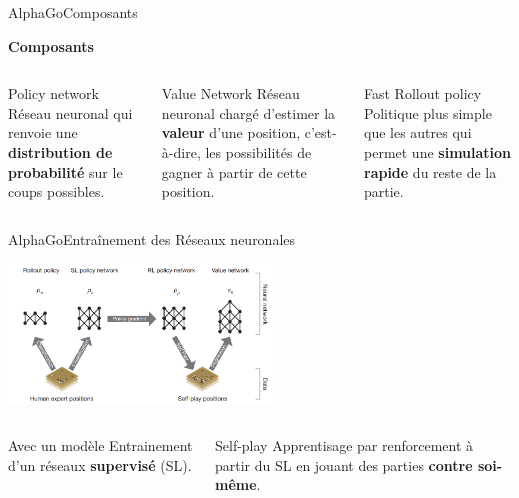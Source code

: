 \begin{frame}{AlphaGo}{Composants}
    \begin{center}
        \textbf{Composants}
    \end{center}
    \begin{columns}[t]
        \begin{column}{.3\textwidth}
            \begin{block}{Policy network}
                Réseau neuronal qui renvoie une \textbf{distribution de probabilité} sur le coups possibles.
            \end{block}
        \end{column}
        \begin{column}{.3\textwidth}
            \begin{block}{Value Network}
                Réseau neuronal chargé d'estimer la \textbf{valeur} d'une position, c'est-à-dire, les possibilités de gagner à partir de cette position.
            \end{block}
        \end{column}
        \begin{column}{.3\textwidth}
            \begin{block}{Fast Rollout policy}
                Politique plus simple que les autres qui permet une \textbf{simulation rapide} du reste de la partie.
            \end{block}
        \end{column}
    \end{columns}
\end{frame}

\begin{frame}{AlphaGo}{Entraînement des Réseaux neuronales}
    \begin{center}
        \includegraphics[width=7cm]{ressources/AlphaGo/Entrainement}
        \begin{columns}[t]
            \begin{column}{.4\textwidth}
                \begin{block}{Avec un modèle}
                    Entrainement d'un réseaux \textbf{supervisé} (SL).
                \end{block}
            \end{column}
            \begin{column}{.4\textwidth}
                \begin{block}{Self-play}
                    Apprentisage par renforcement à partir du SL en jouant des parties \textbf{contre soi-même}.
                \end{block}
            \end{column}
        \end{columns}

    \end{center}
\end{frame}


